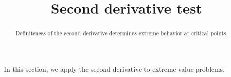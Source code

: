 \documentclass{ximera}
\title{Second derivative test}
\begin{document}
	\begin{abstract}
		Definiteness of the second derivative determines extreme behavior at critical points.
	\end{abstract}
	
	In this section, we apply the second derivative to extreme value problems.
	
	
	
\end{document}
